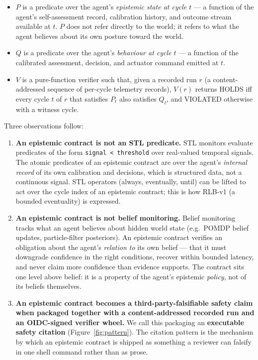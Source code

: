 \documentclass[acmsmall,nonacm=true,review=false]{acmart}
\theoremstyle{plain}
\begin{document}
\begin{itemize}[noitemsep,topsep=2pt]
  \item $P$ is a predicate over the agent's \emph{epistemic state
        at cycle $t$} --- a function of the agent's self-assessment
        record, calibration history, and outcome stream available
        at $t$. $P$ does not refer directly to the world; it
        refers to what the agent believes about its own posture
        toward the world.
  \item $Q$ is a predicate over the agent's \emph{behaviour at
        cycle $t$} --- a function of the calibrated assessment,
        decision, and actuator command emitted at $t$.
  \item $V$ is a pure-function verifier such that, given a
        recorded run $r$ (a content-addressed sequence of
        per-cycle telemetry records), $V(r)$ returns HOLDS iff
        every cycle $t$ of $r$ that satisfies $P_t$ also satisfies
        $Q_t$, and VIOLATED otherwise with a witness cycle.
\end{itemize}

Three observations follow:

\begin{enumerate}[noitemsep,topsep=2pt]
  \item \textbf{An epistemic contract is not an STL predicate.}
        STL monitors evaluate predicates of the form
        \texttt{signal < threshold} over real-valued temporal
        signals. The atomic predicates of an epistemic contract
        are over the agent's \emph{internal record} of its own
        calibration and decisions, which is structured data, not
        a continuous signal. STL operators (always, eventually,
        until) can be lifted to act over the cycle index of an
        epistemic contract; this is how RLB-v1 (a bounded
        eventuality) is expressed.
  \item \textbf{An epistemic contract is not belief monitoring.}
        Belief monitoring tracks what an agent believes about
        hidden world state (e.g.\ POMDP belief updates,
        particle-filter posteriors). An epistemic contract
        verifies an obligation about the agent's \emph{relation
        to} its own belief --- that it must downgrade confidence
        in the right conditions, recover within bounded latency,
        and never claim more confidence than evidence supports.
        The contract sits one level above belief: it is a
        property of the agent's epistemic \emph{policy}, not of
        its beliefs themselves.
  \item \textbf{An epistemic contract becomes a
        third-party-falsifiable safety claim when packaged
        together with a content-addressed recorded run and an
        OIDC-signed verifier wheel.} We call this packaging an
        \textbf{executable safety citation}
        (Figure~\ref{fig:pattern}). The citation pattern is the
        mechanism by which an epistemic contract is shipped as
        something a reviewer can falsify in one shell command
        rather than as prose.
\end{enumerate}
\end{document}
